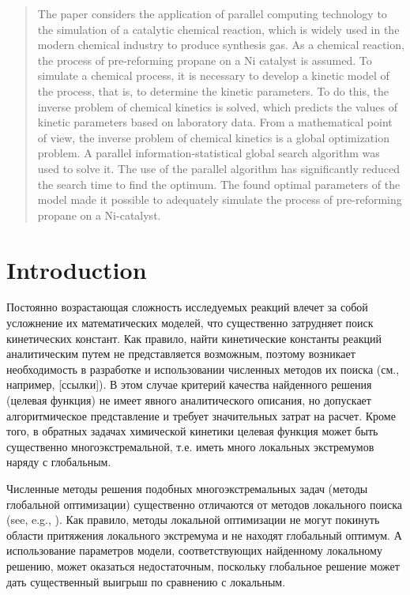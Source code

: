\documentclass{svproc}
\begin{document}
\begin{abstract}

The paper considers the application of parallel computing technology to the simulation of a catalytic chemical reaction, which is widely used in the modern chemical industry to produce synthesis gas. As a chemical reaction, the process of pre-reforming propane on a Ni catalyst is assumed. To simulate a chemical process, it is necessary to develop a kinetic model of the process, that is, to determine the kinetic parameters. To do this, the inverse problem of chemical kinetics is solved, which predicts the values of kinetic parameters based on laboratory data. From a mathematical point of view, the inverse problem of chemical kinetics is a global optimization problem. A parallel information-statistical global search algorithm was used to solve it. The use of the parallel algorithm has significantly reduced the search time to find the optimum. The found optimal parameters of the model made it possible to adequately simulate the process of pre-reforming propane on a Ni-catalyst.

\end{abstract}

\section{Introduction}


Постоянно возрастающая сложность исследуемых реакций влечет за собой усложнение их математических моделей, что существенно затрудняет поиск кинетических констант. Как правило, найти кинетические константы реакций аналитическим путем не представляется возможным, поэтому возникает необходимость в разработке и использовании численных методов их поиска (см., например, [ссылки]). В этом случае критерий качества найденного решения (целевая функция) не имеет явного аналитического описания, но допускает алгоритмическое представление и требует значительных затрат на расчет. Кроме того, в обратных задачах химической кинетики целевая функция может быть существенно многоэкстремальной, т.е. иметь много локальных экстремумов наряду с глобальным. 

Численные методы решения подобных многоэкстремальных задач (методы глобальной оптимизации) существенно отличаются от методов локального поиска (see, e.g., \cite{Sergeyev2017,PaulaviciusZilinskas2014}). Как правило, методы локальной оптимизации не могут покинуть области притяжения локального экстремума и не находят глобальный оптимум. А использование параметров модели, соответствующих найденному локальному решению, может оказаться недостаточным, поскольку глобальное решение может дать существенный выигрыш по сравнению с локальным. 
\end{document}
